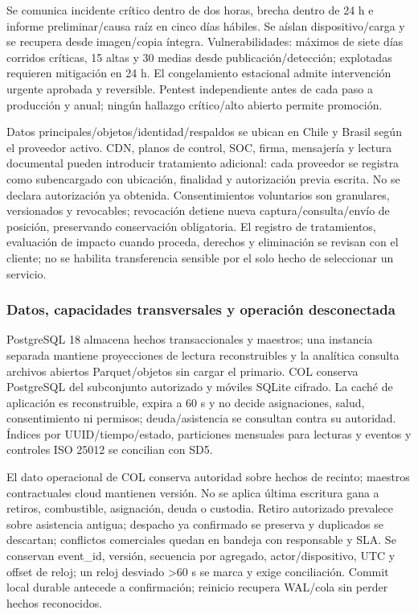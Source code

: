 \documentclass[11pt,letterpaper]{report}
\begin{document}
Se comunica incidente crítico dentro de dos horas, brecha dentro de 24 h e informe preliminar/causa raíz en cinco días hábiles. Se aíslan dispositivo/carga y se recupera desde imagen/copia íntegra. Vulnerabilidades: máximos de siete días corridos críticas, 15 altas y 30 medias desde publicación/detección; explotadas requieren mitigación en 24 h. El congelamiento estacional admite intervención urgente aprobada y reversible. Pentest independiente antes de cada paso a producción y anual; ningún hallazgo crítico/alto abierto permite promoción.

Datos principales/objetos/identidad/respaldos se ubican en Chile y Brasil según el proveedor activo. CDN, planos de control, SOC, firma, mensajería y lectura documental pueden introducir tratamiento adicional: cada proveedor se registra como subencargado con ubicación, finalidad y autorización previa escrita. No se declara autorización ya obtenida. Consentimientos voluntarios son granulares, versionados y revocables; revocación detiene nueva captura/consulta/envío de posición, preservando conservación obligatoria. El registro de tratamientos, evaluación de impacto cuando proceda, derechos y eliminación se revisan con el cliente; no se habilita transferencia sensible por el solo hecho de seleccionar un servicio.

\subsubsection*{Datos, capacidades transversales y operación desconectada}
PostgreSQL 18 almacena hechos transaccionales y maestros; una instancia separada mantiene proyecciones de lectura reconstruibles y la analítica consulta archivos abiertos Parquet/objetos sin cargar el primario. COL conserva PostgreSQL del subconjunto autorizado y móviles SQLite cifrado. La caché de aplicación es reconstruible, expira a 60 s y no decide asignaciones, salud, consentimiento ni permisos; deuda/asistencia se consultan contra su autoridad. Índices por UUID/tiempo/estado, particiones mensuales para lecturas y eventos y controles ISO 25012 se concilian con SD5.

El dato operacional de COL conserva autoridad sobre hechos de recinto; maestros contractuales cloud mantienen versión. No se aplica última escritura gana a retiros, combustible, asignación, deuda o custodia. Retiro autorizado prevalece sobre asistencia antigua; despacho ya confirmado se preserva y duplicados se descartan; conflictos comerciales quedan en bandeja con responsable y SLA. Se conservan event\_id, versión, secuencia por agregado, actor/dispositivo, UTC y offset de reloj; un reloj desviado >60 s se marca y exige conciliación. Commit local durable antecede a confirmación; reinicio recupera WAL/cola sin perder hechos reconocidos.
\end{document}
